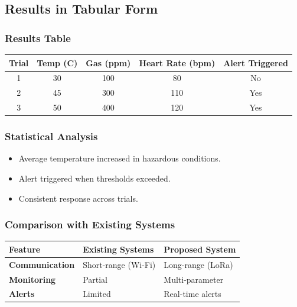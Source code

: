 \documentclass[12pt,a4paper]{article}
\begin{document}
	\subsection{Results in Tabular Form}
	
	\subsubsection{Results Table}
	\begin{center}
		\begin{tabular}{ccccc}
			\toprule
			Trial & Temp (\textdegree C) & Gas (ppm) & Heart Rate (bpm) & Alert Triggered \\
			\midrule
			1 & 30 & 100 & 80 & No \\
			2 & 45 & 300 & 110 & Yes \\
			3 & 50 & 400 & 120 & Yes \\
			\bottomrule
		\end{tabular}
	\end{center}
	
	\subsubsection{Statistical Analysis}
	\begin{itemize}
		\item Average temperature increased in hazardous conditions.
		\item Alert triggered when thresholds exceeded.
		\item Consistent response across trials.
	\end{itemize}
	
	\subsubsection{Comparison with Existing Systems}
	\begin{center}
		\begin{tabular}{>{\bfseries}p{4cm} p{4.5cm} p{4.5cm}}
			\toprule
			Feature & Existing Systems & Proposed System \\
			\midrule
			Communication & Short-range (Wi-Fi) & Long-range (LoRa) \\
			Monitoring & Partial & Multi-parameter \\
			Alerts & Limited & Real-time alerts \\
			\bottomrule
		\end{tabular}
	\end{center}
	
\end{document}
